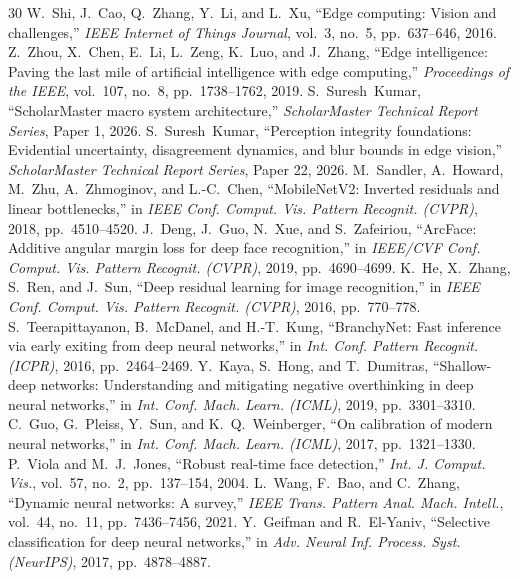 \documentclass[10pt,journal,compsoc]{IEEEtran}
\begin{document}
\begin{thebibliography}{30}
 W.~Shi, J.~Cao, Q.~Zhang, Y.~Li, and L.~Xu, ``Edge computing: Vision and challenges,'' \emph{IEEE Internet of Things Journal}, vol.~3, no.~5, pp.~637--646, 2016.
 Z.~Zhou, X.~Chen, E.~Li, L.~Zeng, K.~Luo, and J.~Zhang, ``Edge intelligence: Paving the last mile of artificial intelligence with edge computing,'' \emph{Proceedings of the IEEE}, vol.~107, no.~8, pp.~1738--1762, 2019.
 S.~Suresh~Kumar, ``ScholarMaster macro system architecture,'' \emph{ScholarMaster Technical Report Series}, Paper 1, 2026.
 S.~Suresh~Kumar, ``Perception integrity foundations: Evidential uncertainty, disagreement dynamics, and blur bounds in edge vision,'' \emph{ScholarMaster Technical Report Series}, Paper 22, 2026.
 M.~Sandler, A.~Howard, M.~Zhu, A.~Zhmoginov, and L.-C.~Chen, ``MobileNetV2: Inverted residuals and linear bottlenecks,'' in \emph{IEEE Conf. Comput. Vis. Pattern Recognit. (CVPR)}, 2018, pp.~4510--4520.
 J.~Deng, J.~Guo, N.~Xue, and S.~Zafeiriou, ``ArcFace: Additive angular margin loss for deep face recognition,'' in \emph{IEEE/CVF Conf. Comput. Vis. Pattern Recognit. (CVPR)}, 2019, pp.~4690--4699.
 K.~He, X.~Zhang, S.~Ren, and J.~Sun, ``Deep residual learning for image recognition,'' in \emph{IEEE Conf. Comput. Vis. Pattern Recognit. (CVPR)}, 2016, pp.~770--778.
 S.~Teerapittayanon, B.~McDanel, and H.-T.~Kung, ``BranchyNet: Fast inference via early exiting from deep neural networks,'' in \emph{Int. Conf. Pattern Recognit. (ICPR)}, 2016, pp.~2464--2469.
 Y.~Kaya, S.~Hong, and T.~Dumitras, ``Shallow-deep networks: Understanding and mitigating negative overthinking in deep neural networks,'' in \emph{Int. Conf. Mach. Learn. (ICML)}, 2019, pp.~3301--3310.
 C.~Guo, G.~Pleiss, Y.~Sun, and K.~Q.~Weinberger, ``On calibration of modern neural networks,'' in \emph{Int. Conf. Mach. Learn. (ICML)}, 2017, pp.~1321--1330.
 P.~Viola and M.~J.~Jones, ``Robust real-time face detection,'' \emph{Int. J. Comput. Vis.}, vol.~57, no.~2, pp.~137--154, 2004.
 L.~Wang, F.~Bao, and C.~Zhang, ``Dynamic neural networks: A survey,'' \emph{IEEE Trans. Pattern Anal. Mach. Intell.}, vol.~44, no.~11, pp.~7436--7456, 2021.
 Y.~Geifman and R.~El-Yaniv, ``Selective classification for deep neural networks,'' in \emph{Adv. Neural Inf. Process. Syst. (NeurIPS)}, 2017, pp.~4878--4887.

\end{thebibliography}
\end{document}
